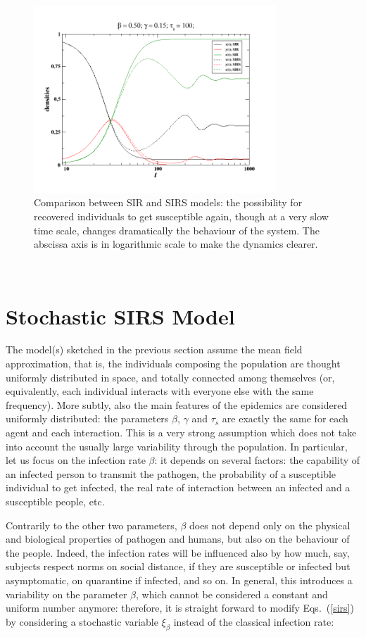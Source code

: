 \documentclass{article}
\begin{document}
\begin{figure}
  \centering
  \includegraphics[width=91mm]{Fig1.png}
  \caption{Comparison between SIR and SIRS models: the possibility for recovered individuals to get susceptible again, though at a very slow time scale, changes dramatically the behaviour of the system. The abscissa axis is in logarithmic scale to make the dynamics clearer.}
  \label{fig1}
\end{figure}

\ 

\section{Stochastic SIRS Model}

The model(s) sketched in the previous section assume the mean field approximation, that is, the individuals composing the population are thought uniformly distributed in space, and totally connected among themselves (or, equivalently, each individual interacts with everyone else with the same frequency). More subtly, also the main features of the epidemics are considered uniformly distributed: the parameters $\beta$, $\gamma$ and $\tau_s$ are exactly the same for each agent and each interaction. This is a very strong assumption which does not take into account the usually large variability through the population. In particular, let us focus on the infection rate $\beta$: it depends on several factors: the capability of an infected person to transmit the pathogen, the probability of a susceptible individual to get infected, the real rate of interaction between an infected and a susceptible people, etc. 

Contrarily to the other two parameters, $\beta$ does not depend only on the physical and biological properties of pathogen and humans, but also on the behaviour of the people. Indeed, the infection rates will be influenced also by how much, say, subjects respect norms on social distance, if they are susceptible or infected but asymptomatic, on quarantine if infected, and so on. In general, this introduces a variability on the parameter $\beta$, which cannot be considered a constant and uniform number anymore: therefore, it is straight forward to modify Eqs.~(\ref{sirs}) by considering a stochastic variable $\xi_\beta$ instead of the classical infection rate:
\end{document}
